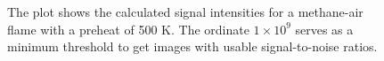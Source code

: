 \begin{figure}

\centering



\caption[Methane-air flame results - II]{The plot shows the calculated signal intensities for a methane-air flame with a preheat of 500 K. The ordinate \(1\times10^9\) serves as a minimum threshold to get images with usable signal-to-noise ratios.}

\label{fig:01-500}

\end{figure}
